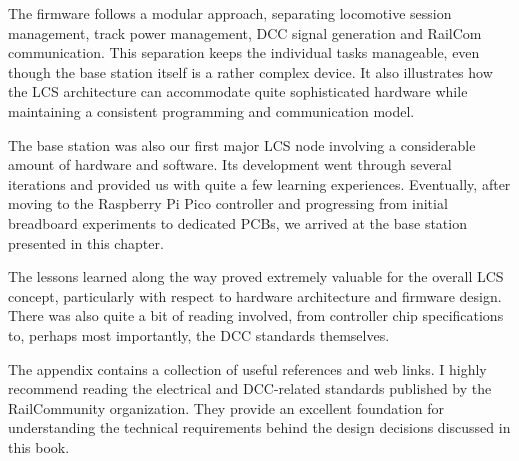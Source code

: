 The firmware follows a modular approach, separating locomotive session management, track power management, DCC signal generation and RailCom communication. This separation keeps the individual tasks manageable, even though the base station itself is a rather complex device. It also illustrates how the LCS architecture can accommodate quite sophisticated hardware while maintaining a consistent programming and communication model.

The base station was also our first major LCS node involving a considerable amount of hardware and software. Its development went through several iterations and provided us with quite a few learning experiences. Eventually, after moving to the Raspberry Pi Pico controller and progressing from initial breadboard experiments to dedicated PCBs, we arrived at the base station presented in this chapter.

The lessons learned along the way proved extremely valuable for the overall LCS concept, particularly with respect to hardware architecture and firmware design. There was also quite a bit of reading involved, from controller chip specifications to, perhaps most importantly, the DCC standards themselves.

The appendix contains a collection of useful references and web links. I highly recommend reading the electrical and DCC-related standards published by the RailCommunity organization. They provide an excellent foundation for understanding the technical requirements behind the design decisions discussed in this book.